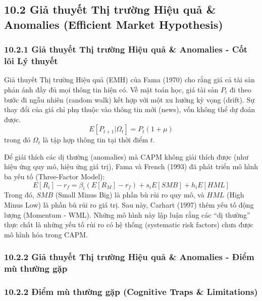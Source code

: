\documentclass[
]{article}
\begin{document}
\subsection{10.2 Giả thuyết Thị trường Hiệu quả \& Anomalies (Efficient
Market
Hypothesis)}\label{giux1ea3-thuyux1ebft-thux1ecb-trux1b0ux1eddng-hiux1ec7u-quux1ea3-anomalies-efficient-market-hypothesis}

\subsubsection{10.2.1 Giả thuyết Thị trường Hiệu quả \& Anomalies - Cốt
lõi Lý
thuyết}\label{giux1ea3-thuyux1ebft-thux1ecb-trux1b0ux1eddng-hiux1ec7u-quux1ea3-anomalies---cux1ed1t-luxf5i-luxfd-thuyux1ebft}

Giả thuyết Thị trường Hiệu quả (EMH) của Fama (1970) cho rằng giá cả tài
sản phản ánh đầy đủ mọi thông tin hiện có. Về mặt toán học, giá tài sản
\(P_t\) đi theo bước đi ngẫu nhiên (random walk) kết hợp với một xu
hướng kỳ vọng (drift). Sự thay đổi của giá chỉ phụ thuộc vào thông tin
mới (news), vốn không thể dự đoán được.
\[ E[P_{t+1} | \Omega_t] = P_t (1 + \mu) \] trong đó \(\Omega_t\) là tập
hợp thông tin tại thời điểm \(t\).

Để giải thích các dị thường (anomalies) mà CAPM không giải thích được
(như hiệu ứng quy mô, hiệu ứng giá trị), Fama và French (1993) đã phát
triển mô hình ba yếu tố (Three-Factor Model):
\[ E[R_i] - r_f = \beta_i (E[R_M] - r_f) + s_i E[SMB] + h_i E[HML] \]
Trong đó, \(SMB\) (Small Minus Big) là phần bù rủi ro quy mô, và \(HML\)
(High Minus Low) là phần bù rủi ro giá trị. Sau này, Carhart (1997) thêm
yếu tố động lượng (Momentum - WML). Những mô hình này lập luận rằng các
``dị thường'' thực chất là những yếu tố rủi ro có hệ thống (systematic
risk factors) chưa được mô hình hóa trong CAPM.

\subsubsection{10.2.2 Giả thuyết Thị trường Hiệu quả \& Anomalies - Điểm
mù thường
gặp}\label{giux1ea3-thuyux1ebft-thux1ecb-trux1b0ux1eddng-hiux1ec7u-quux1ea3-anomalies---ux111iux1ec3m-muxf9-thux1b0ux1eddng-gux1eb7p}

\subsubsection{10.2.2 Điểm mù thường gặp (Cognitive Traps \&
Limitations)}\label{ux111iux1ec3m-muxf9-thux1b0ux1eddng-gux1eb7p-cognitive-traps-limitations-78}
\end{document}
